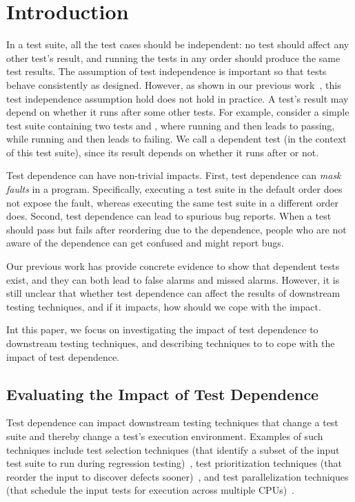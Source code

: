 \section{Introduction}


In a test suite, all the test cases should be independent:
no test should affect any other test's result, and running
the tests in any order should produce the same test results.
The assumption of test independence is important so that
tests behave consistently as designed. However,
as shown in our previous work~\cite{}, this test independence
assumption hold does not hold in practice.
A test's result may depend on whether it runs after
some other tests. For example, consider 
a simple test suite containing two tests  and ,
where running  and then 
leads to  passing, while running  and
then  leads to  failing. We call
 a dependent test (in the context of this test suite),
since its result depends on whether it runs after  or not.


Test dependence can have non-trivial impacts. First,
test dependence can \textit{mask faults} in a program.
Specifically, executing a test suite in the default order does not
expose the fault, whereas executing the same test suite in
a different order does. Second, 
test dependence can lead to spurious bug reports.
When a test should pass but fails after reordering due to
the dependence, people who are not aware of the dependence
can get confused and might report bugs. 



Our previous work has provide concrete evidence to
show that dependent tests exist, and they can both lead
to false alarms and missed alarms. However, it is still
unclear that whether test dependence can affect the
results of downstream testing techniques, and if it
impacts, how should we cope with the impact.

Int this paper, we focus on investigating the impact of
test dependence to downstream testing techniques, and
describing techniques to to cope with the impact of test dependence.

\subsection{Evaluating the Impact of Test Dependence}

Test dependence can impact downstream testing
techniques that change a test suite and thereby change a test's
execution environment. Examples of such techniques include
test selection techniques (that identify a subset of the input
test suite to run during regression testing)~\cite{},
test prioritization techniques (that reorder the input to
discover defects sooner)~\cite{}, and test parallelization
techniques (that schedule the input tests for execution across
multiple CPUs)~\cite{}.

